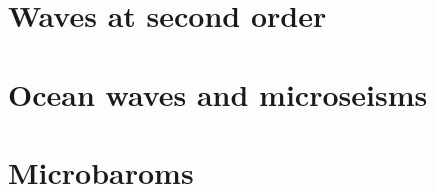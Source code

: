 \documentclass[a4paper]{book}  %
\begin{document}
\chapter{Waves at second order}\label{chnl2}

\cleardoublepage
%
\chapter{Ocean waves and microseisms}\label{chsismo}

\cleardoublepage
\chapter{Microbaroms}\label{chbaroms}

% 
%
%
%



\end{document}
